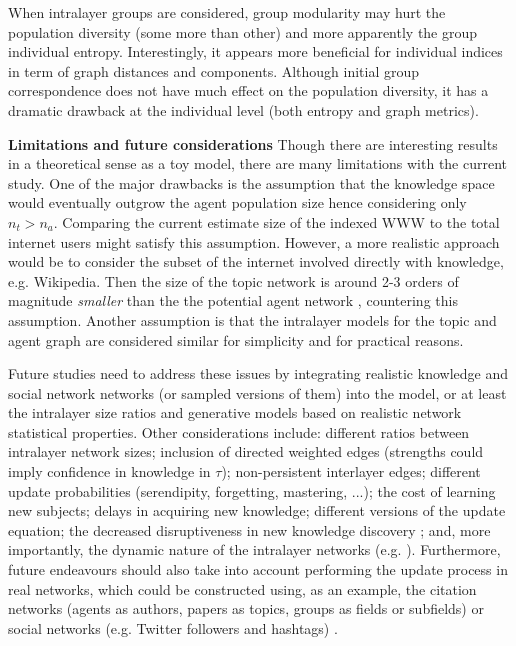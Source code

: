 \documentclass{svproc}
\begin{document}
When intralayer groups are considered,
    group modularity may hurt the population diversity (some more than other)
    and more apparently the group individual entropy.
Interestingly, it appears more beneficial for individual indices in term of graph distances and components.
Although initial group correspondence
    does not have much effect on the population diversity,
    it has a dramatic drawback at the individual level (both entropy and graph metrics).




\textbf{Limitations and future considerations}
Though there are interesting results in a theoretical sense as a toy model, there are many limitations with the current study.
    One of the major drawbacks is the assumption that the knowledge space would eventually outgrow the agent population size hence considering only $n_t > n_a$.
    Comparing the current estimate size of the indexed WWW \footnotemark[1] to the total internet users \footnotemark[2] might satisfy this assumption.
    However, a more realistic approach would be to consider the subset of the internet involved directly with knowledge, e.g. Wikipedia. Then the size of the topic network \footnotemark[3] is around 2-3 orders of magnitude \textit{smaller} than the the potential agent network \footnotemark[2], countering this assumption.
Another assumption is that the intralayer models for the topic and agent graph are considered similar for simplicity and for practical reasons.

Future studies need to address these issues
    by integrating realistic knowledge and social network networks (or sampled versions of them) into the model,
    or at least the intralayer size ratios and generative models based on realistic network statistical properties.
Other considerations include:
    different ratios between intralayer network sizes;
    inclusion of directed weighted edges (strengths could imply confidence in knowledge in $\tau$);
    non-persistent interlayer edges;
    different update probabilities (serendipity, forgetting, mastering, ...);
    the cost of learning new subjects;
    delays in acquiring new knowledge;
    different versions of the update equation;
    the decreased disruptiveness in new knowledge discovery \cite{Park2021-jb};
    and, more importantly, the dynamic nature of the intralayer networks (e.g. \cite{Sun2020-qj}).
Furthermore, future endeavours should also take into account performing the update process in real networks,
    which could be constructed using, as an example, the citation networks (agents as authors, papers as topics, groups as fields or subfields) or social networks (e.g. Twitter followers and hashtags) \cite{Weng2015-zt}.
\end{document}

